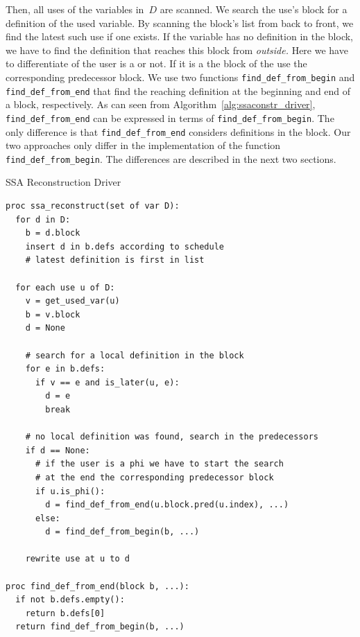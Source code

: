 Then, all uses of the variables in~$D$ are scanned.
We search the use's block for a definition of the used variable.
By scanning the block's list from back to front, we find the latest such use if one exists. 
If the variable has no definition in the block, we have to find the definition that reaches this block from \emph{outside.}
Here we have to differentiate of the user is a \phifun or not.
If it is a \phifun the block of the use the corresponding predecessor block.
We use two functions \verb|find_def_from_begin| and \verb|find_def_from_end| that find the reaching definition at the beginning and end of a block, respectively. 
As can seen from Algorithm~\ref{alg:ssaconstr_driver}, \verb|find_def_from_end| can be expressed in terms of \verb|find_def_from_begin|. 
The only difference is that \verb|find_def_from_end| considers definitions in the block. 
Our two approaches only differ in the implementation of the function \verb|find_def_from_begin|.
The differences are described in the next two sections.
\begin{algorithm}
	\caption{SSA Reconstruction Driver}
	\label{alg:ssaconstr_driver}

\begin{verbatim}
proc ssa_reconstruct(set of var D):
  for d in D:
    b = d.block
    insert d in b.defs according to schedule
    # latest definition is first in list

  for each use u of D:
    v = get_used_var(u)
    b = v.block
    d = None

    # search for a local definition in the block
    for e in b.defs:
      if v == e and is_later(u, e):
        d = e
        break
        
    # no local definition was found, search in the predecessors
    if d == None:
      # if the user is a phi we have to start the search 
      # at the end the corresponding predecessor block 
      if u.is_phi():
        d = find_def_from_end(u.block.pred(u.index), ...)
      else:
        d = find_def_from_begin(b, ...)

    rewrite use at u to d

proc find_def_from_end(block b, ...):
  if not b.defs.empty():
    return b.defs[0]
  return find_def_from_begin(b, ...)
\end{verbatim}
\end{algorithm}

